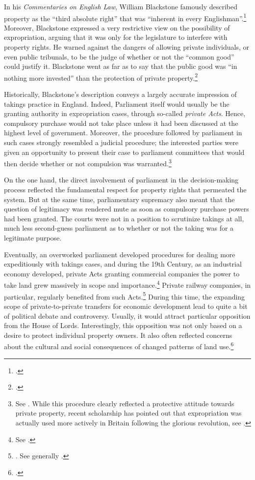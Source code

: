 \documentclass[12pt,a4paper]{book} %
\begin{document}
In his {\it Commentaries on English Law}, William Blackstone famously described property as the ``third absolute right'' that was ``inherent in every Englishman''.\footcite[134-135]{blackstone79}  Moreover, Blackstone expressed a very restrictive view on the possibility of expropriation, arguing that it was only for the legislature to interfere with property rights. He warned against the dangers of allowing private individuals, or even public tribunals, to be the judge of whether or not the ``common good'' could justify it. Blackstone went as far as to say that the public good was ``in nothing more invested'' than the protection of private property.\footcite[134-135]{blackstone79}

Historically, Blackstone's description conveys a largely accurate impression of takings practice in England. Indeed, Parliament itself would usually be the granting authority in expropriation cases, through so-called {\it private Acts}. Hence, compulsory purchase would not take place unless it had been discussed at the highest level of government. Moreover, the procedure followed by parliament in such cases strongly resembled a judicial procedure; the interested parties were given an opportunity to present their case to parliament committees that would then decide whether or not compulsion was warranted.\footnote{See \cite[13-16]{allen00}. While this procedure clearly reflected a protective attitude towards private property, recent scholarship has pointed out that expropriation was actually used more actively in Britain following the glorious revolution, see \cite{hoppit11}.} 

On the one hand, the direct involvement of parliament in the decision-making process reflected the fundamental respect for property rights that permeated the system. But at the same time, parliamentary supremacy also meant that the question of legitimacy was rendered mute as soon as compulsory purchase powers had been granted. The courts were not in a position to scrutinize takings at all, much less second-guess parliament as to whether or not the taking was for a legitimate purpose.

Eventually, an overworked parliament developed procedures for dealing more expeditiously with takings cases, and during the 19th Century, as an industrial economy developed, private Acts granting commercial companies the power to take land grew massively in scope and importance.\footnote{See \cite[204]{allen00}.} Private railway companies, in particular, regularly benefited from such Acts.\footnote{\cite[204]{allen00}. See generally \cite{kostal97}.} During this time, the expanding scope of private-to-private transfers for economic development lead to quite a bit of political debate and controversy. Usually, it would attract particular opposition from the House of Lords. Interestingly, this opposition was not only based on a desire to protect individual property owners. It also often reflected concerns about the cultural and social consequences of changed patterns of land use.\footcite[204]{allen00} 
\end{document}
